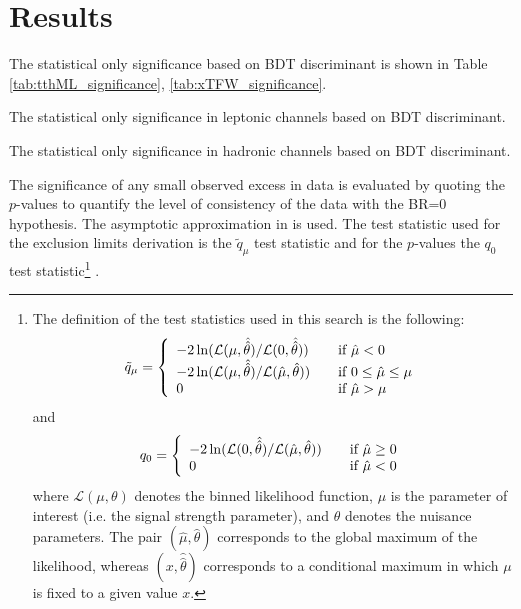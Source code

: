 \section{Results}
\label{sec:results}

The statistical only significance based on BDT discriminant is shown in Table \ref{tab:tthML_significance}, \ref{tab:xTFW_significance}.

\begin{table}
\caption{The statistical only significance in leptonic channels based on BDT discriminant.}
\label{tab:tthML_significance}

\end{table}

\begin{table}
\caption{The statistical only significance in hadronic channels based on BDT discriminant.}
\label{tab:xTFW_significance}

\end{table}

The significance of any small observed excess in data is evaluated by quoting the $p$-values to quantify the level of consistency of the data with the BR=0 hypothesis. The asymptotic approximation in \cite{CCGV} is used. The test statistic used for the exclusion limits derivation is the $\tilde{q}_\mu$ test statistic
and for the $p$-values the $q_{0}$ test statistic\footnote{The definition of the test statistics used in this search is the following:
\[ \tilde q_\mu = \left\{
  \begin{array}{l l}
    -2 \ln (\mathcal{L}(\mu,\hat{\hat{\theta}})/\mathcal{L}(0,\hat{\hat\theta})) & \quad \text{if $\hat\mu < 0$}\\
    -2 \ln (\mathcal{L}(\mu,\hat{\hat{\theta}})/\mathcal{L}(\hat \mu,\hat\theta)) & \quad \text{if $0 \leq \hat\mu \leq \mu$}\\
    0 & \quad \text{if $\hat\mu > \mu$}
  \end{array} \right.\]
and
\[ q_0 = \left\{
  \begin{array}{l l}
    -2 \ln (\mathcal{L}(0,\hat{\hat{\theta}})/\mathcal{L}(\hat\mu,\hat\theta)) &\quad \text{if $\hat\mu \geq 0$}\\
    0 & \quad \text{if $\hat\mu <0$}
  \end{array} \right.\]
where $\mathcal L(\mu,\theta)$ denotes the binned likelihood function, $\mu$ is the parameter of interest (i.e.
the signal strength parameter), and $\theta$ denotes the nuisance parameters. The pair $(\hat\mu, \hat\theta)$
corresponds to the global maximum of the likelihood, whereas $(x, \hat{\hat\theta})$ corresponds to a conditional
maximum in which $\mu$ is fixed to a given value $x$.
}
\cite{CCGV}.

